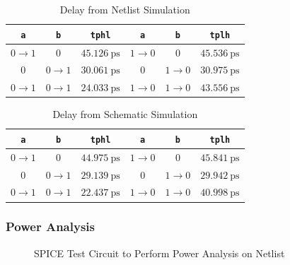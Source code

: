 \documentclass{article}
\begin{document}
	\begin{table}[H]
	\begin{center}
	\caption{Delay from Netlist Simulation}
	\label{table::nor_gate_delay_analysis}
	\begin{tabular}{| c | c | c || c | c | c |}
		\hline
		\texttt{a} & \texttt{b} & \texttt{tphl} & \texttt{a} & \texttt{b} & \texttt{tplh} \\
		\hline	
		$0 \rightarrow 1$ & $0$ & $45.126\ \text{ps}$ & $1 \rightarrow 0$ & $0$ & $45.536\ \text{ps}$\\
		\hline	
		$0$ & $0 \rightarrow 1$ & $30.061\ \text{ps}$ & $0$ & $1 \rightarrow 0$ & $30.975\ \text{ps}$\\
		\hline	
		$0 \rightarrow 1$ & $0 \rightarrow 1$ & $24.033\ \text{ps}$ & $1 \rightarrow 0$ & $1 \rightarrow 0$ & $43.556\ \text{ps}$\\
		\hline
	\end{tabular}
	\end{center}
	\end{table}
	
	\begin{table}[H]
	\begin{center}
	\caption{Delay from Schematic Simulation}
	\label{table::nor_gate_delay_analysis_schem}
	\begin{tabular}{| c | c | c || c | c | c |}
		\hline
		\texttt{a} & \texttt{b} & \texttt{tphl} & \texttt{a} & \texttt{b} & \texttt{tplh} \\
		\hline	
		$0 \rightarrow 1$ & $0$ & $44.975\ \text{ps}$ & $1 \rightarrow 0$ & $0$ & $45.841\ \text{ps}$\\
		\hline	
		$0$ & $0 \rightarrow 1$ & $29.139\ \text{ps}$ & $0$ & $1 \rightarrow 0$ & $29.942\ \text{ps}$\\
		\hline	
		$0 \rightarrow 1$ & $0 \rightarrow 1$ & $22.437\ \text{ps}$ & $1 \rightarrow 0$ & $1 \rightarrow 0$ & $40.998\ \text{ps}$\\
		\hline
	\end{tabular}
	\end{center}
	\end{table}
	
	\subsubsection{Power Analysis}
	\begin{figure}[H]
		
		\caption{SPICE Test Circuit to Perform Power Analysis on Netlist}
		\label{fig::nor_power_analysis_test_circuit}
	\end{figure}
	
\end{document}
